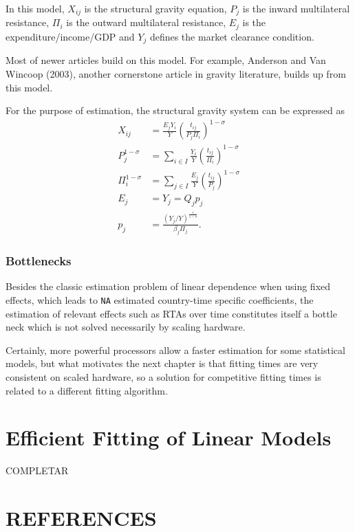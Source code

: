 \documentclass[12pt,reqno,oneside,pdftex]{formato-puc/puctesis} %
\begin{document}
In this model, \(X_{ij}\) is the structural gravity equation, \(P_j\) is
the inward multilateral resistance, \(\Pi_i\) is the outward
multilateral resistance, \(E_j\) is the expenditure/income/GDP and
\(Y_j\) defines the market clearance condition.

Most of newer articles build on this model. For example, Anderson and
Van Wincoop (2003), another cornerstone article in gravity literature,
builds up from this model.

For the purpose of estimation, the structural gravity system can be
expressed as \begin{align*}
X_{ij} &= \frac{E_j Y_i}{Y} \left( \frac{t_{ij}}{P_j \Pi_i} \right)^{1 - \sigma} \label{eq:1}\\
P_j^{1 - \sigma} &= \sum_{i \in I} \frac{Y_i}{Y} \left( \frac{t_{ij}}{\Pi_i} \right)^{1 - \sigma} \\
\Pi_i^{1 - \sigma} &= \sum_{j \in I} \frac{E_j}{Y} \left( \frac{t_{ij}}{P_j} \right)^{1 - \sigma} \\
E_j &= Y_j = Q_j p_j \\
p_j &= \frac{(Y_j / Y)^{\frac{1}{1 - \sigma}}}{\beta_j \Pi_j}.
\end{align*}

\hypertarget{bottlenecks}{%
\subsection{Bottlenecks}\label{bottlenecks}}

Besides the classic estimation problem of linear dependence when using
fixed effects, which leads to \texttt{NA} estimated country-time
specific coefficients, the estimation of relevant effects such as RTAs
over time constitutes itself a bottle neck which is not solved
necessarily by scaling hardware.

Certainly, more powerful processors allow a faster estimation for some
statistical models, but what motivates the next chapter is that fitting
times are very consistent on scaled hardware, so a solution for
competitive fitting times is related to a different fitting algorithm.

\chapter{Efficient Fitting of Linear Models}

COMPLETAR

\chapter*{REFERENCES}
\end{document}
